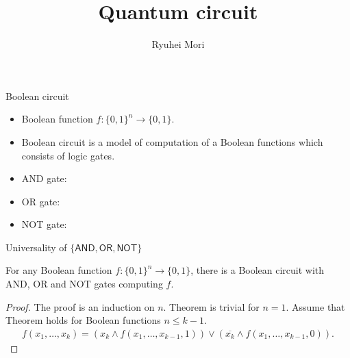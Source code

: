 \documentclass{beamer}
\title{Quantum circuit}
\author{Ryuhei Mori}
\institute{Tokyo Institute of Technology}
\newcommand\emm[1]{\textcolor{redorange}{{#1}}}
\begin{document}
\begin{frame}[plain]
\maketitle
\end{frame}



\begin{frame}{Boolean circuit}
\begin{itemize}
\setlength{\itemsep}{2em}
\item Boolean function $f\colon \{0,1\}^n\to\{0,1\}$.
\item \emm{Boolean circuit} is a model of computation of a Boolean functions which consists of logic \emm{gates}.
\item AND gate:
\item OR gate:
\item NOT gate:
\end{itemize}
\end{frame}

\begin{frame}{Universality of $\{\mathsf{AND}, \mathsf{OR},\mathsf{NOT}\}$}
\begin{theorem}
For \emm{any} Boolean function $f\colon \{0,1\}^n\to\{0,1\}$, there is a Boolean circuit with AND, OR and NOT gates computing $f$.
\end{theorem}
\begin{proof}
The proof is an induction on $n$. Theorem is trivial for $n=1$.
Assume that Theorem holds for Boolean functions $n \le k-1$.
\begin{align*}
f(x_1,\dotsc,x_k) = (x_k \wedge f(x_1,\dotsc,x_{k-1}, 1)) \vee (\overline{x_k} \wedge f(x_1,\dotsc,x_{k-1}, 0)).
\end{align*}
\end{proof}
\end{frame}
\end{document}
